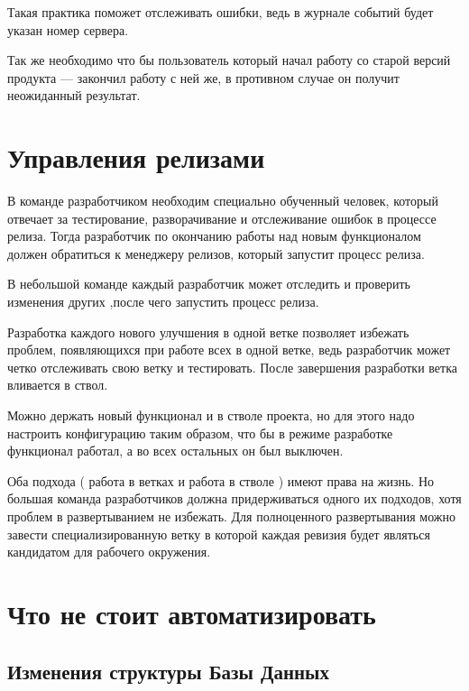  
 Такая практика поможет отслеживать ошибки, ведь в журнале событий будет указан номер сервера.
 
 Так же необходимо что бы пользователь который начал работу со старой версий продукта --- закончил работу с ней же, в противном случае он получит неожиданный результат.
 
 \section{ Управления релизами } \label{sect3_12}
 
 В команде разработчиком необходим специально обученный человек, который отвечает за тестирование, разворачивание и отслеживание ошибок в процессе релиза. Тогда разработчик по окончанию работы над новым функционалом должен обратиться к менеджеру релизов, который запустит процесс релиза.
 
 В небольшой команде каждый разработчик может отследить и проверить изменения других ,после чего запустить процесс релиза.
 
 Разработка каждого нового улучшения в одной ветке позволяет избежать проблем, появляющихся при работе всех в одной ветке, ведь разработчик может четко отслеживать свою ветку и тестировать. После завершения разработки ветка вливается в ствол.
 
 
 Можно держать новый функционал и в стволе проекта, но для этого надо настроить конфигурацию таким образом, что бы в режиме разработке функционал работал, а во всех остальных он был выключен.
 
 Оба подхода ( работа в ветках и работа в стволе ) имеют права на жизнь. Но большая команда разработчиков должна придерживаться одного их подходов, хотя проблем в развертыванием не избежать. Для полноценного развертывания можно завести специализированную ветку в которой каждая ревизия будет являться кандидатом для рабочего окружения.

   
\section{ Что не стоит автоматизировать} \label{sect3_13}

\subsection{ Изменения структуры Базы Данных } \label{sect3_13_1}

